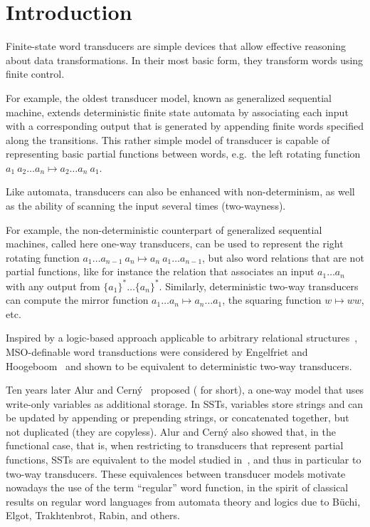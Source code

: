 \documentclass{article}
\providecommand{\AP}{}\NewDocumentCommand{\reintro}{o m}{#2}
\begin{document}
 


\section{Introduction}\label{sec:intro}
\enlargethispage{-\baselineskip}
Finite-state word transducers are simple devices that allow 
effective reasoning about data transformations. 
In their most basic form, they transform words using finite control. 
\AP
For example, the oldest transducer model, 
known as generalized sequential machine, 
extends deterministic finite state automata by associating each input with a corresponding output
that is generated by appending finite words specified along the transitions.
This rather simple model of transducer is capable of representing 
basic partial functions between words, e.g.~the left 
rotating function $a_1\: a_2\dots a_n\mapsto a_2\dots a_n \: a_1$.
\AP
Like automata, transducers can also be enhanced with non-determinism,
as well as the ability of scanning the input several times (two-wayness).
\AP
For example, the non-deterministic counterpart of 
generalized sequential machines, called here one-way transducers, 
can be used to represent the right rotating function 
$a_1\dots a_{n-1}\: a_n\mapsto a_n\:a_1\dots a_{n-1}$,
but also word relations that are not partial functions, like for 
instance the relation that associates an input $a_1\dots a_n$ 
with any output from $\{a_1\}^*\dots \{a_n\}^*$.
Similarly, deterministic two-way transducers can compute 
the mirror function $a_1\dots a_n \mapsto a_n\dots a_1$,
the squaring function $w \mapsto w w$, etc.

\AP
Inspired by a logic-based approach applicable to arbitrary relational structures~\cite{CE12}, 
MSO-definable word transductions were considered by Engelfriet and
Hoogeboom~\cite{eh01} and shown to be equivalent to deterministic 
two-way transducers.
\AP
Ten years later Alur and Cern{\'y}~\cite{DBLP:conf/fsttcs/AlurC10} proposed 
 ( for short), 
a one-way model that uses write-only variables as additional storage. 
In SSTs, variables store strings and  can be updated by appending or prepending strings, or 
concatenated together, but not duplicated (they are copyless). 
Alur and Cern{\'y} also showed that, in the functional case, 
that is, when restricting to transducers that represent partial functions,
SSTs are equivalent to the model studied in~\cite{eh01},
and thus in particular to two-way transducers.
These equivalences between transducer models motivate nowadays 
the use of the term ``regular'' word function, in the spirit of
classical results on regular word languages from automata theory 
and logics due to B\"uchi, Elgot, Trakhtenbrot, Rabin, and others. 
\end{document}
